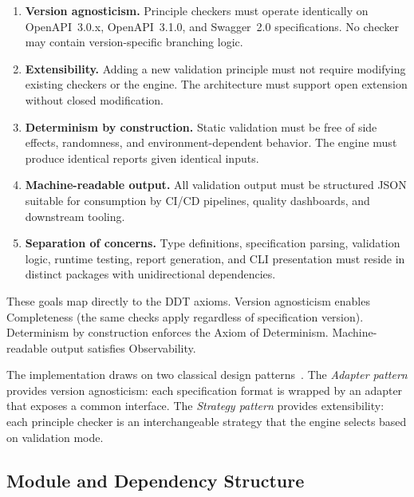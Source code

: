 \begin{enumerate}
    \item \textbf{Version agnosticism.} Principle checkers must operate identically on OpenAPI~3.0.x, OpenAPI~3.1.0, and Swagger~2.0 specifications. No checker may contain version-specific branching logic.

    \item \textbf{Extensibility.} Adding a new validation principle must not require modifying existing checkers or the engine. The architecture must support open extension without closed modification.

    \item \textbf{Determinism by construction.} Static validation must be free of side effects, randomness, and environment-dependent behavior. The engine must produce identical reports given identical inputs.

    \item \textbf{Machine-readable output.} All validation output must be structured JSON suitable for consumption by CI/CD pipelines, quality dashboards, and downstream tooling.

    \item \textbf{Separation of concerns.} Type definitions, specification parsing, validation logic, runtime testing, report generation, and CLI presentation must reside in distinct packages with unidirectional dependencies.
\end{enumerate}

These goals map directly to the DDT axioms. Version agnosticism enables Completeness (the same checks apply regardless of specification version). Determinism by construction enforces the Axiom of Determinism. Machine-readable output satisfies Observability.

The implementation draws on two classical design patterns~\cite{gof}. The \textit{Adapter pattern} provides version agnosticism: each specification format is wrapped by an adapter that exposes a common interface. The \textit{Strategy pattern} provides extensibility: each principle checker is an interchangeable strategy that the engine selects based on validation mode.

\subsection{Module and Dependency Structure}
\label{subsec:module-structure}

